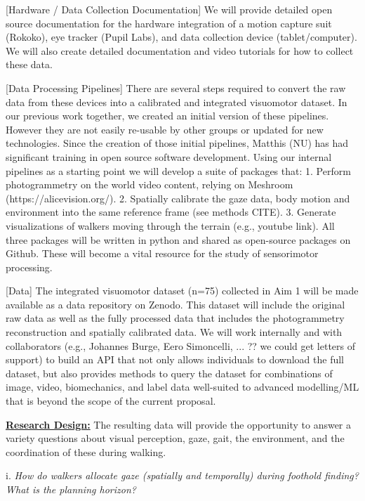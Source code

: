 [Hardware / Data Collection Documentation] We will provide detailed open source documentation for the hardware integration of a motion capture suit (Rokoko), eye tracker (Pupil Labs), and data collection device (tablet/computer). We will also create detailed documentation and video tutorials for how to collect these data.

[Data Processing Pipelines] There are several steps required to convert the raw data from these devices into a calibrated and integrated visuomotor dataset. In our previous work together, we created an initial version of these pipelines. However they are not easily re-usable by other groups or updated for new technologies. Since the creation of those initial pipelines, Matthis (NU)
has had significant training in open source software development. Using our internal pipelines as a starting point we will develop a suite of packages that: 1. Perform photogrammetry on the world video content, relying on Meshroom (https://alicevision.org/). 2. Spatially calibrate the gaze data, body motion and environment into the same reference frame (see methods CITE). 3. Generate visualizations of walkers moving through the terrain (e.g., youtube link). All three packages will be written in
python and shared as open-source packages on Github.  These will become a vital resource for the study of sensorimotor processing.  

[Data] The integrated visuomotor dataset (n=75) collected in Aim 1 will be made available as a data repository on Zenodo. This dataset will include the original raw data as well as the fully processed data that includes the photogrammetry reconstruction and spatially calibrated data.  We will work internally and with collaborators (e.g., Johannes Burge, Eero Simoncelli, ... ?? we could get letters of support) to build an API that not only allows individuals to download the full dataset, but also provides methods to query the dataset for combinations of image, video, biomechanics, and label data well-suited to advanced modelling/ML that is beyond the scope of the current proposal.

\noindent\underline{\textbf{Research Design:}} The resulting data will provide the opportunity to answer a variety questions about visual perception, gaze, gait, the environment, and the coordination of these during walking.

i. \emph{How do walkers allocate gaze (spatially and temporally) during foothold finding? What is the planning horizon?}

